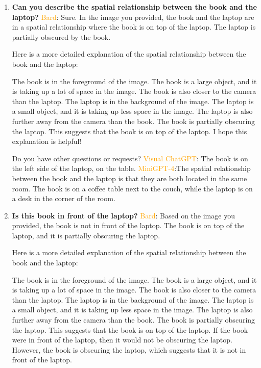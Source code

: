 \begin{enumerate}
    \item \textbf{Can you describe the spatial relationship between the book and the laptop?}
    \subitem \textcolor{orange}{Bard}:
    Sure. In the image you provided, the book and the laptop are in a spatial relationship where the book is on top of the laptop. The laptop is partially obscured by the book.
    
    Here is a more detailed explanation of the spatial relationship between the book and the laptop:
    
    The book is in the foreground of the image. The book is a large object, and it is taking up a lot of space in the image. The book is also closer to the camera than the laptop.
    The laptop is in the background of the image. The laptop is a small object, and it is taking up less space in the image. The laptop is also further away from the camera than the book.
    The book is partially obscuring the laptop. This suggests that the book is on top of the laptop.
    I hope this explanation is helpful!
    
    Do you have other questions or requests?
    \subitem \textcolor{orange}{Visual ChatGPT}: The book is on the left side of the laptop, on the table.
    \subitem \textcolor{orange}{MiniGPT-4}:The spatial relationship between the book and the laptop is that they are both located in the same room. The book is on a coffee table next to the couch, while the laptop is on a desk in the corner of the room. 
    \item \textbf{Is this book in front of the laptop?}
    \subitem \textcolor{orange}{Bard}: 
    Based on the image you provided, the book is not in front of the laptop. The book is on top of the laptop, and it is partially obscuring the laptop.
    
    Here is a more detailed explanation of the spatial relationship between the book and the laptop:
    
    The book is in the foreground of the image. The book is a large object, and it is taking up a lot of space in the image. The book is also closer to the camera than the laptop.
    The laptop is in the background of the image. The laptop is a small object, and it is taking up less space in the image. The laptop is also further away from the camera than the book.
    The book is partially obscuring the laptop. This suggests that the book is on top of the laptop.
    If the book were in front of the laptop, then it would not be obscuring the laptop. However, the book is obscuring the laptop, which suggests that it is not in front of the laptop.
    

\end{enumerate}
